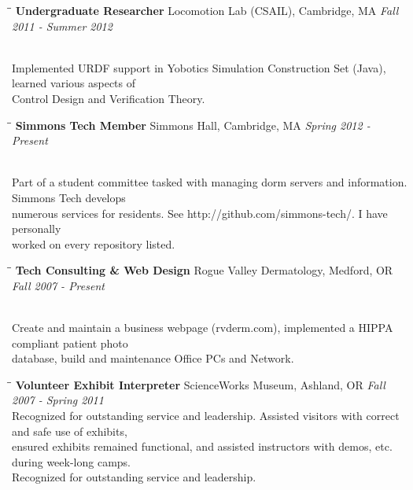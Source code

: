 \documentclass{res}
\begin{document}
\begin{resume}
			\begin{tabbing}
				\hspace{2.3in}\= \hspace{2.6in}\= \kill %
				{\bf Undergraduate Researcher}	\>Locomotion Lab (CSAIL), Cambridge, MA	\> \textit{Fall 2011 - Summer 2012}

				\\ Implemented URDF support in Yobotics Simulation Construction Set (Java), learned various aspects of \\Control Design and Verification Theory.

			\end{tabbing}\vspace{-20pt}

			\begin{tabbing}
				\hspace{2.3in}\= \hspace{2.6in}\= \kill %
				{\bf Simmons Tech Member}	\>Simmons Hall, Cambridge, MA	\> \textit{Spring 2012 - Present}

				\\Part of a student committee tasked with managing dorm servers and information. Simmons Tech develops\\numerous services for residents. See http://github.com/simmons-tech/. I have personally\\worked on every repository listed.

			\end{tabbing}\vspace{-20pt}

			\begin{tabbing}
				\hspace{2.3in}\= \hspace{2.6in}\= \kill %
				{\bf Tech Consulting \& Web Design}	\>Rogue Valley Dermatology, Medford, OR	\> \textit{Fall 2007 - Present}

				\\Create and maintain a business webpage (rvderm.com), implemented a HIPPA compliant patient photo \\database, build and maintenance Office PCs and Network.

			\end{tabbing}\vspace{-20pt}

			\begin{tabbing}
				\hspace{2.3in}\= \hspace{2.6in}\= \kill %
				{\bf Volunteer Exhibit Interpreter}	\>ScienceWorks Museum, Ashland, OR	\> \textit{Fall 2007 - Spring 2011}
				\\Recognized for outstanding service and leadership. Assisted visitors with correct and safe use of exhibits,\\ensured exhibits remained functional, and assisted instructors with demos, etc. during week-long camps.\\Recognized for outstanding service and leadership.


\end{tabbing}
\end{resume}
\end{document}
